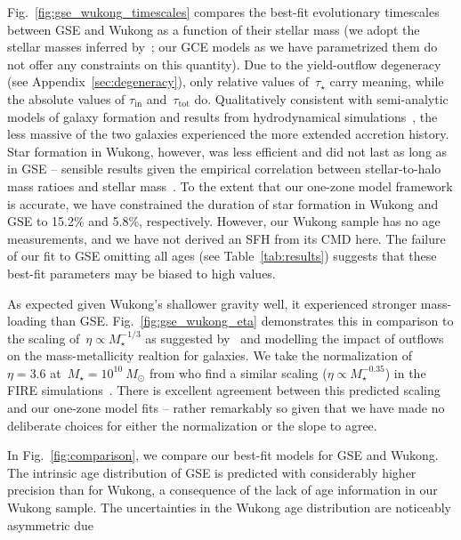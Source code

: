 \documentclass[ms.tex]{subfiles}
\begin{document}
Fig.~\ref{fig:gse_wukong_timescales} compares the best-fit evolutionary
timescales between GSE and Wukong as a function of their stellar mass (we adopt
the stellar masses inferred by~\citealt{Naidu2021, Naidu2022}; our GCE models
as we have parametrized them do not offer any constraints on this quantity).
Due to the yield-outflow degeneracy (see Appendix~\ref{sec:degeneracy}), only
relative values of~$\tau_\star$ carry meaning, while the absolute values of
$\tau_\text{in}$ and~$\tau_\text{tot}$ do.
Qualitatively consistent with semi-analytic models of galaxy formation
\citep[e.g.,][]{Baugh2006, Somerville2015a, Behroozi2019} and results from
hydrodynamical simulations~\citep[e.g.,][]{GarrisonKimmel2019}, the less
massive of the two galaxies experienced the more extended accretion history.
Star formation in Wukong, however, was less efficient and did not last as long
as in GSE -- sensible results given the empirical correlation between
stellar-to-halo mass ratioes and stellar mass~\citep{Hudson2015}.
To the extent that our one-zone model framework is accurate, we have
constrained the duration of star formation in Wukong and GSE to 15.2\% and
5.8\%, respectively.
However, our Wukong sample has no age measurements, and we have not derived
an SFH from its CMD here.
The failure of our fit to GSE omitting all ages (see Table~\ref{tab:results})
suggests that these best-fit parameters may be biased to high values.
\par
As expected given Wukong's shallower gravity well, it experienced stronger
mass-loading than GSE.
Fig.~\ref{fig:gse_wukong_eta} demonstrates this in comparison to the scaling
of~$\eta \propto M_\star^{-1/3}$ as suggested by~\citet{Finlator2008} and
\citet{Peeples2011} modelling the impact of outflows on the mass-metallicity
realtion for galaxies.
We take the normalization of~$\eta = 3.6$ at~$M_\star = 10^{10}~M_\odot$ from
\citet{Muratov2015} who find a similar scaling ($\eta \propto M_\star^{-0.35}$)
in the FIRE simulations~\citep{Hopkins2014}.
There is excellent agreement between this predicted scaling and our one-zone
model fits -- rather remarkably so given that we have made no deliberate
choices for either the normalization or the slope to agree.
\par
In Fig.~\ref{fig:comparison}, we compare our best-fit models for GSE and Wukong.
The intrinsic age distribution of GSE is predicted with considerably higher
precision than for Wukong, a consequence of the lack of age information in our
Wukong sample.
The uncertainties in the Wukong age distribution are noticeably asymmetric due
\end{document}
